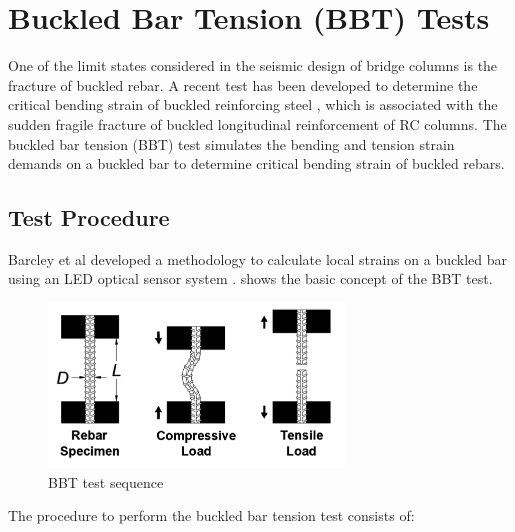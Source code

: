 \section{Buckled Bar Tension (BBT) Tests}

One of the limit states considered in the seismic design of bridge columns is the fracture of buckled rebar.  A recent test has  been developed  to determine the critical bending strain of buckled reinforcing steel \cite{Barcley2019}, which is associated with the sudden fragile fracture of buckled longitudinal reinforcement of RC columns. The buckled bar tension (BBT) test simulates the bending and tension strain demands on a buckled bar to determine critical bending strain of buckled rebars. 

\subsection{Test Procedure}
Barcley et al \cite{Barcley2019} developed a methodology to calculate local strains on a buckled bar using an LED optical sensor system \cite{NorthernDigitalInc.2020}.  shows the basic concept of the BBT test.

\begin{figure}[htbp]
	\centering
	\includegraphics[width=0.7\textwidth]{Chapter-3/figs/BBT_Sequence}
	\caption{BBT test sequence\cite{Barcley2019}}
	\label{fig:BBTseq}
\end{figure}

The procedure to perform the buckled bar tension test consists of:

